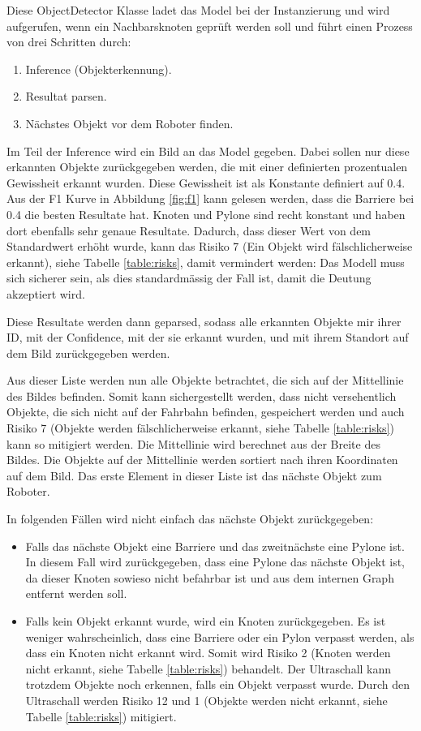 Diese ObjectDetector Klasse ladet das Model bei der Instanzierung und wird aufgerufen, wenn ein Nachbarsknoten geprüft werden soll und führt einen Prozess von drei Schritten durch:

\begin{enumerate}
    \item Inference (Objekterkennung).
    \item Resultat parsen.
    \item Nächstes Objekt vor dem Roboter finden.
\end{enumerate}

Im Teil der Inference wird ein Bild an das Model gegeben. Dabei sollen nur diese erkannten Objekte zurückgegeben werden, die mit einer definierten prozentualen Gewissheit erkannt wurden. Diese Gewissheit ist als Konstante definiert auf 0.4. Aus der F1 Kurve in Abbildung \ref{fig:f1} kann gelesen werden, dass die Barriere bei 0.4 die besten Resultate hat. Knoten und Pylone sind recht konstant und haben dort ebenfalls sehr genaue Resultate. Dadurch, dass dieser Wert von dem Standardwert erhöht wurde, kann das Risiko 7 (Ein Objekt wird fälschlicherweise erkannt), siehe Tabelle \ref{table:risks}, damit vermindert werden: Das Modell muss sich sicherer sein, als dies standardmässig der Fall ist, damit die Deutung akzeptiert wird.

Diese Resultate werden dann geparsed, sodass alle erkannten Objekte mir ihrer ID, mit der Confidence, mit der sie erkannt wurden, und mit ihrem Standort auf dem Bild zurückgegeben werden.

Aus dieser Liste werden nun alle Objekte betrachtet, die sich auf der Mittellinie des Bildes befinden. Somit kann sichergestellt werden, dass nicht versehentlich Objekte, die sich nicht auf der Fahrbahn befinden, gespeichert werden und auch Risiko 7 (Objekte werden fälschlicherweise erkannt, siehe Tabelle \ref{table:risks}) kann so mitigiert werden. Die Mittellinie wird berechnet aus der Breite des Bildes. Die Objekte auf der Mittellinie werden sortiert nach ihren Koordinaten auf dem Bild. Das erste Element in dieser Liste ist das nächste Objekt zum Roboter.

In folgenden Fällen wird nicht einfach das nächste Objekt zurückgegeben:

\begin{itemize}
    \item Falls das nächste Objekt eine Barriere und das zweitnächste eine Pylone ist. In diesem Fall wird zurückgegeben, dass eine Pylone das nächste Objekt ist, da dieser Knoten sowieso nicht befahrbar ist und aus dem internen Graph entfernt werden soll.
    \item Falls kein Objekt erkannt wurde, wird ein Knoten zurückgegeben. Es ist weniger wahrscheinlich, dass eine Barriere oder ein Pylon verpasst werden, als dass ein Knoten nicht erkannt wird. Somit wird Risiko 2 (Knoten werden nicht erkannt, siehe Tabelle \ref{table:risks}) behandelt. Der Ultraschall kann trotzdem Objekte noch erkennen, falls ein Objekt verpasst wurde. Durch den Ultraschall werden Risiko 12 und 1 (Objekte werden nicht erkannt, siehe Tabelle \ref{table:risks}) mitigiert.
\end{itemize}

